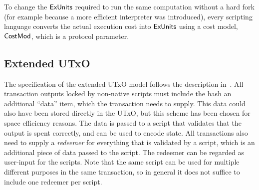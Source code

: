 To change the $\mathsf{ExUnits}$ required to
run the same computation without a hard fork (for example because a
more efficient interpreter was introduced), every scripting language
converts the actual execution cost into $\mathsf{ExUnits}$ using a cost model,
$\mathsf{CostMod}$, which is a protocol parameter.

\subsection{Extended UTxO}

The specification of the extended UTxO model follows the description in~\cite{plutus_eutxo}.
All transaction outputs locked by non-native scripts must include the hash an additional ``data'' item, which the transaction needs to supply. This data could also have been stored directly in the UTxO, but this scheme has been chosen for space efficiency reasons. The data is passed to a script that validates that the output is spent correctly, and can be used to encode state.
All transactions also need to supply a \emph{redeemer} for everything that is validated by a script, which is an additional piece of data passed to the script. The redeemer can be regarded as user-input for the scripts. Note that the same script can be used for multiple different purposes in the same transaction, so in general it does not suffice to include one redeemer per script.